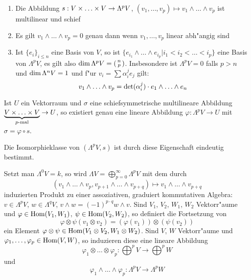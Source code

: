 \begin{emptythm}[Eigenschaften:]\begin{enumerate}[label=\arabic*),leftmargin=*]
\item
	Die Abbildung $s: V \times \ldots \times V \to \Lambda^p V$, $(v_1,\ldots ,v_p) \mapsto v_1 \wedge \ldots \wedge v_p$ ist multilinear und schief
\item
	Es gilt $v_1 \wedge \ldots \wedge v_p = 0$ genau dann wenn $v_1, \ldots , v_p$ linear abh"angig sind
\item
	Ist $\{e_i\}_{i \le n}$ eine Basis von $V$, so ist $\{e_{i_1} \wedge \ldots \wedge e_{i_p} | i_1 < i_2 < \ldots < i_p\}$ eine Basis von $\Lambda^pV$, es gilt also $\operatorname{dim} \Lambda^pV = \left( \begin{smallmatrix} n \\ p \end{smallmatrix} \right)$. Insbesondere ist $\Lambda^pV = 0$ falls $p > n$ und $\operatorname{dim} \Lambda^nV = 1$ und f"ur $v_i = \sum \alpha_i^j e_j$ gilt:
		\[ v_1 \wedge \ldots \wedge v_p = \operatorname{det} (\alpha_i^j) \cdot e_1 \wedge \ldots \wedge e_n \]
\end{enumerate}\end{emptythm}

\begin{emptythm}
Ist $U$ ein Vektorraum und $\sigma$ eine schiefsymmetrische multilineare Abbildung $\underbrace{V \times \ldots  \times V}_{p\text{-mal}} \to U$, so existiert genau eine lineare Abbildung $\varphi: \Lambda^pV \to U$ mit $\sigma = \varphi \circ s$.
\begin{center}\end{center}
Die Isomorphieklasse von $(\Lambda^pV, s)$ ist durch diese Eigenschaft eindeutig bestimmt.
\end{emptythm}

Setzt man $\Lambda^0V = k$, so wird $\Lambda V = \bigoplus_{p=0}^{\infty}\Lambda^pV$ mit dem durch
	\[ (v_1 \wedge \ldots \wedge v_p, v_{p+1} \wedge \ldots \wedge v_{p+q}) \mapsto v_1 \wedge \ldots \wedge v_{p+q} \]
induzierten Produkt zu einer assoziativen, graduiert kommutativen Algebra: $v \in \Lambda^pV$, $w \in \Lambda^qV$, $v \wedge w = (-1)^{p \cdot q} w \wedge v$. Sind $V_1$, $V_2$, $W_1$, $W_2$ Vektorr"aume und $\varphi \in \operatorname{Hom}(V_1, W_1)$, $\psi \in \operatorname{Hom}(V_2, W_2)$, so definiert die Fortsetzung von 
	\[ \varphi \otimes \psi (v_1 \otimes v_2) = (\varphi(v_1)) \otimes (\psi(v_2)) \]
ein Element $\varphi \otimes \psi \in \operatorname{Hom}(V_1 \otimes V_2, W_1 \otimes W_2)$. Sind $V$, $W$ Vektorr"aume und $\varphi_1,\ldots ,\varphi_p \in \operatorname{Hom}(V, W)$, so induzieren diese eine lineare Abbildung
	\[ \varphi_1 \otimes \ldots \otimes \varphi_p : \bigoplus^p V \to \bigoplus^p W \]
und
	\[ \varphi_1 \wedge \ldots  \wedge \varphi_p : \Lambda^pV \to \Lambda^pW \]

